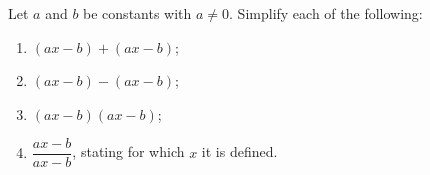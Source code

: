 Let $a$ and $b$ be constants with $a\ne0$. Simplify each of the following:
\begin{enumerate}
\item[(a)] $(ax-b)+(ax-b)$;
\item[(b)] $(ax-b)-(ax-b)$;
\item[(c)] $(ax-b)(ax-b)$;
\item[(d)] $\dfrac{ax-b}{ax-b}$, stating for which $x$ it is defined.
\end{enumerate}
